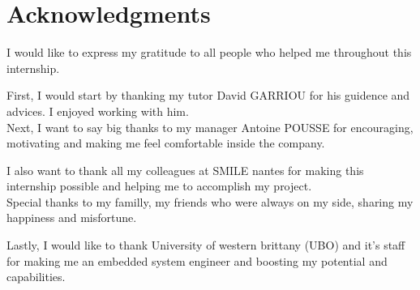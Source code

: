 \section{Acknowledgments}
I would like to express my gratitude to all people who helped me throughout this internship.


\vspace{20px}
First, I would start by thanking my tutor \og David GARRIOU \fg for his guidence and advices. I enjoyed working with him.\\



\vspace{5px}
Next, I want to say big thanks to my manager \og Antoine POUSSE \fg for encouraging, motivating and making me feel comfortable inside the company. \\
\vspace{10px}

I also want to thank all my colleagues at \og SMILE nantes \fg for making this internship possible and helping me to accomplish my project.\\

\vspace{10px}
Special thanks to my familly, my friends who were always on my side, sharing my happiness and misfortune.

\vspace{20px}
Lastly, I would like to thank University of western brittany (UBO) and it's staff for making me an embedded system engineer and boosting my potential and capabilities.